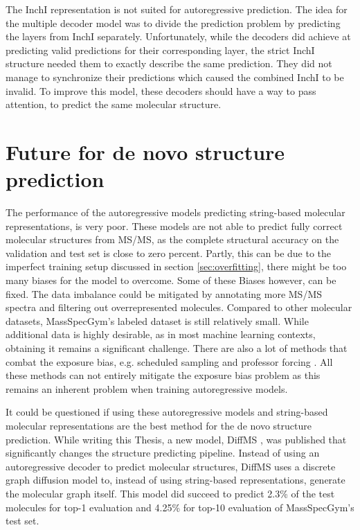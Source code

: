 The InchI representation is not suited for autoregressive prediction.
The idea for the multiple decoder model was to divide the prediction problem by predicting the layers from InchI separately.
Unfortunately, while the decoders did achieve at predicting valid predictions for their corresponding layer, the strict InchI structure needed them to exactly describe the same prediction.
They did not manage to synchronize their predictions which caused the combined InchI to be invalid.
To improve this model, these decoders should have a way to pass attention, to predict the same molecular structure.

\section{Future for de novo structure prediction}

The performance of the autoregressive models predicting string-based molecular representations, is very poor.
These models are not able to predict fully correct molecular structures from \ac{MS/MS}, as the complete structural accuracy on the validation and test set is close to zero percent.
Partly, this can be due to the imperfect training setup discussed in section \ref{sec:overfitting}, there might be too many biases for the model to overcome.
Some of these Biases however, can be fixed.
The data imbalance could be mitigated by annotating more \ac{MS/MS} spectra and filtering out overrepresented molecules.
Compared to other molecular datasets, MassSpecGym's labeled dataset is still relatively small.
While additional data is highly desirable, as in most machine learning contexts, obtaining it remains a significant challenge.
There are also a lot of methods that combat the exposure bias, e.g. scheduled sampling \cite{bengio2015scheduled} and professor forcing \cite{lamb2016professor}.
All these methods can not entirely mitigate the exposure bias problem as this remains an inherent problem when training autoregressive models.

It could be questioned if using these autoregressive models and string-based molecular representations are the best method for the de novo structure prediction.
While writing this Thesis, a new model, DiffMS \cite{bohde2025diffms}, was published that significantly changes the structure predicting pipeline.
Instead of using an autoregressive decoder to predict molecular structures, DiffMS uses a discrete graph diffusion model to, instead of using string-based representations, generate the molecular graph itself.
This model did succeed to predict 2.3\% of the test molecules for top-1 evaluation and 4.25\% for top-10 evaluation of MassSpecGym's test set.

